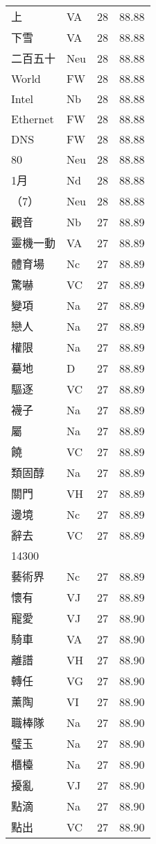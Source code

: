 \documentclass[twocolumn]{book}
\begin{document}
\begin{supertabular}{llrr}
上 & VA & 28 &  88.88\\
下雪 & VA & 28 &  88.88\\
二百五十 & Neu & 28 &  88.88\\
World & FW & 28 &  88.88\\
Intel & Nb & 28 &  88.88\\
Ethernet & FW & 28 &  88.88\\
DNS & FW & 28 &  88.88\\
80 & Neu & 28 &  88.88\\
1月 & Nd & 28 &  88.88\\
（7） & Neu & 28 &  88.88\\
觀音 & Nb & 27 &  88.89\\
靈機一動 & VA & 27 &  88.89\\
體育場 & Nc & 27 &  88.89\\
驚嚇 & VC & 27 &  88.89\\
變項 & Na & 27 &  88.89\\
戀人 & Na & 27 &  88.89\\
權限 & Na & 27 &  88.89\\
驀地 & D & 27 &  88.89\\
驅逐 & VC & 27 &  88.89\\
襪子 & Na & 27 &  88.89\\
屬 & Na & 27 &  88.89\\
饒 & VC & 27 &  88.89\\
類固醇 & Na & 27 &  88.89\\
關門 & VH & 27 &  88.89\\
邊境 & Nc & 27 &  88.89\\
辭去 & VC & 27 &  88.89\\
14300\\
藝術界 & Nc & 27 &  88.89\\
懷有 & VJ & 27 &  88.89\\
寵愛 & VJ & 27 &  88.90\\
騎車 & VA & 27 &  88.90\\
離譜 & VH & 27 &  88.90\\
轉任 & VG & 27 &  88.90\\
薰陶 & VI & 27 &  88.90\\
職棒隊 & Na & 27 &  88.90\\
璧玉 & Na & 27 &  88.90\\
櫃檯 & Na & 27 &  88.90\\
擾亂 & VJ & 27 &  88.90\\
點滴 & Na & 27 &  88.90\\
點出 & VC & 27 &  88.90\\

\end{supertabular}
\end{document}
